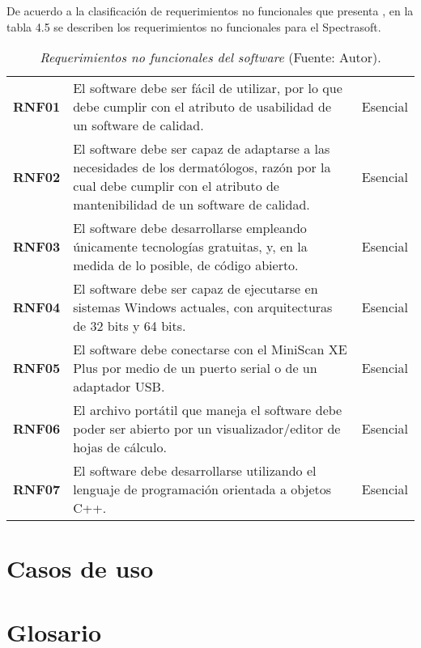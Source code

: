 	De acuerdo a la clasificaci\'{o}n de requerimientos no funcionales que presenta \cite{Sommerville}, en la tabla 4.5 se describen los requerimientos no funcionales para el Spectrasoft.
	
	\begin{table}[h]
		\small
		\caption[Requerimientos no funcionales del software]{\textit{Requerimientos no funcionales del software} (Fuente: Autor).}
		\centering
		\setlength{\extrarowheight}{\altocelda}
		\begin{tabulary}{\anchotabla}{|c|J|c|}
			\hline
			 &  & \\ \hline
			\textbf{RNF01} & El software debe ser f\'{a}cil de utilizar, por lo que debe cumplir con el atributo de usabilidad de un software de calidad. & Esencial\\ \hline
			\textbf{RNF02} & El software debe ser capaz de adaptarse a las necesidades de los dermat\'{o}logos, raz\'{o}n por la cual debe cumplir con el atributo de mantenibilidad de un software de calidad. & Esencial\\ \hline
			\textbf{RNF03} & El software debe desarrollarse empleando \'{u}nicamente tecnolog\'{i}as gratuitas, y, en la medida de lo posible, de c\'{o}digo abierto. & Esencial\\ \hline
			\textbf{RNF04} & El software debe ser capaz de ejecutarse en sistemas Windows actuales, con arquitecturas de 32 bits y 64 bits. & Esencial\\ \hline
			\textbf{RNF05} & El software debe conectarse con el MiniScan XE Plus por medio de un puerto serial o de un adaptador USB. & Esencial\\ \hline
			\textbf{RNF06} & El archivo port\'{a}til que maneja el software debe poder ser abierto por un visualizador/editor de hojas de c\'{a}lculo. & Esencial\\ \hline
			\textbf{RNF07} & El software debe desarrollarse utilizando el lenguaje de programaci\'{o}n orientada a objetos C++. & Esencial\\ \hline
		\end{tabulary}
	\end{table}

\section{Casos de uso}

\section{Glosario}
